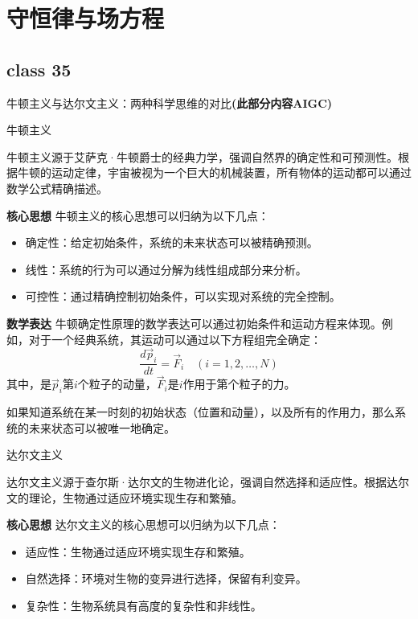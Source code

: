\documentclass[12pt, a4paper, oneside, UTF8]{ctexbook}  %
\begin{document}
\else
\fi
\chapter{守恒律与场方程}
\section{class 35}
\begin{add}
牛顿主义与达尔文主义：两种科学思维的对比\textbf{(此部分内容AIGC)}
\begin{center}
	牛顿主义
\end{center}
牛顿主义源于艾萨克·牛顿爵士的经典力学，强调自然界的确定性和可预测性。根据牛顿的运动定律，宇宙被视为一个巨大的机械装置，所有物体的运动都可以通过数学公式精确描述。

\textbf{核心思想}
牛顿主义的核心思想可以归纳为以下几点：
\begin{itemize}
    \item 确定性：给定初始条件，系统的未来状态可以被精确预测。
    \item 线性：系统的行为可以通过分解为线性组成部分来分析。
    \item 可控性：通过精确控制初始条件，可以实现对系统的完全控制。
\end{itemize}

\textbf{数学表达}
牛顿确定性原理的数学表达可以通过初始条件和运动方程来体现。例如，对于一个经典系统，其运动可以通过以下方程组完全确定：
\begin{equation*} 
	\frac{d\vec{p}_i}{dt} = \vec{F}_i \quad (i = 1, 2, \dots, N) 
\end{equation*}
其中，是$\vec{p}_i$第$i$个粒子的动量，$\vec{F}_i$是$i$作用于第个粒子的力。

如果知道系统在某一时刻的初始状态（位置和动量），以及所有的作用力，那么系统的未来状态可以被唯一地确定。
\begin{center}
	达尔文主义
\end{center}
达尔文主义源于查尔斯·达尔文的生物进化论，强调自然选择和适应性。根据达尔文的理论，生物通过适应环境实现生存和繁殖。

\textbf{核心思想}
达尔文主义的核心思想可以归纳为以下几点：
\begin{itemize}
    \item 适应性：生物通过适应环境实现生存和繁殖。
    \item 自然选择：环境对生物的变异进行选择，保留有利变异。
    \item 复杂性：生物系统具有高度的复杂性和非线性。
\end{itemize}


\end{add}
\end{document}
